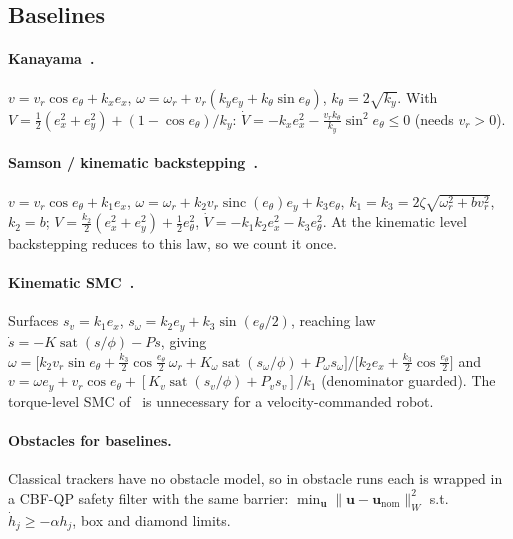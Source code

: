 \documentclass[11pt,a4paper]{article}
\begin{document}
\subsection{Baselines}
\paragraph{Kanayama~\cite{kanayama1990}.} $v=v_r\cos e_\theta+k_xe_x$, $\omega=\omega_r+v_r(k_ye_y+k_\theta\sin e_\theta)$, $k_\theta=2\sqrt{k_y}$. With $V=\tfrac12(e_x^2+e_y^2)+(1-\cos e_\theta)/k_y$: $\dot V=-k_xe_x^2-\tfrac{v_rk_\theta}{k_y}\sin^2e_\theta\le0$ (needs $v_r>0$).
\paragraph{Samson / kinematic backstepping~\cite{samson1995,jiang1997}.} $v=v_r\cos e_\theta+k_1e_x$, $\omega=\omega_r+k_2v_r\operatorname{sinc}(e_\theta)e_y+k_3e_\theta$, $k_1=k_3=2\zeta\sqrt{\omega_r^2+bv_r^2}$, $k_2=b$; $V=\tfrac{k_2}{2}(e_x^2+e_y^2)+\tfrac12e_\theta^2$, $\dot V=-k_1k_2e_x^2-k_3e_\theta^2$. At the kinematic level backstepping reduces to this law, so we count it once.
\paragraph{Kinematic SMC~\cite{elyoussef2014}.} Surfaces $s_v=k_1e_x$, $s_\omega=k_2e_y+k_3\sin(e_\theta/2)$, reaching law $\dot s=-K\operatorname{sat}(s/\phi)-Ps$, giving
$\omega=\big[k_2v_r\sin e_\theta+\tfrac{k_3}{2}\cos\tfrac{e_\theta}{2}\,\omega_r+K_\omega\operatorname{sat}(s_\omega/\phi)+P_\omega s_\omega\big]/\big[k_2e_x+\tfrac{k_3}{2}\cos\tfrac{e_\theta}{2}\big]$ and
$v=\omega e_y+v_r\cos e_\theta+[K_v\operatorname{sat}(s_v/\phi)+P_vs_v]/k_1$ (denominator guarded). The torque-level SMC of~\cite{yang1999} is unnecessary for a velocity-commanded robot.
\paragraph{Obstacles for baselines.} Classical trackers have no obstacle model, so in obstacle runs each is wrapped in a CBF-QP safety filter with the same barrier: $\min_{\bm u}\|\bm u-\bm u_{\text{nom}}\|_W^2$ s.t.\ $\dot h_j\ge-\alpha h_j$, box and diamond limits.
\end{document}

